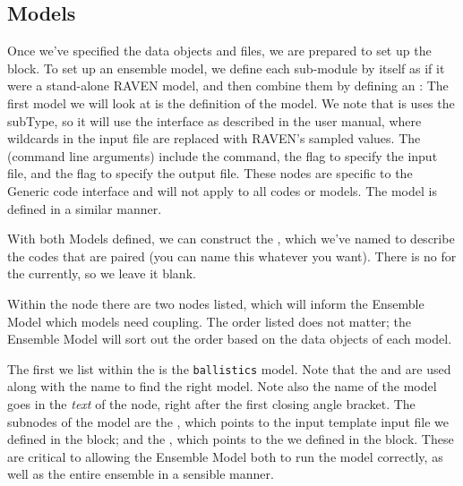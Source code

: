 \subsection{Models}
Once we've specified the data objects and files, we are prepared to set up the  block.  To set
up an ensemble model, we define each sub-module by itself as if it were a stand-alone RAVEN model, and then
combine them by defining an :
The first model we will look at is the definition of the  model.  We note that is uses
the  subType, so it will use the interface as described in the user manual, where
wildcards in the input file are replaced with RAVEN's sampled values.  The  (command line
arguments) include the  command, the  flag to specify the input file, and the
 flag to specify the output file.  These nodes are specific to the Generic code interface and
will not apply to all codes or models. The  model is defined in a similar manner.

With both Models defined, we can construct the , which we've named
 to describe the codes that are paired (you can name this whatever you
want).  There is no  for the  currently, so we leave it blank.

Within the  node there are two  nodes listed, which will inform the
Ensemble Model which models need coupling.  The order listed does not matter; the Ensemble Model will sort out
the order based on the  data objects of each model.

The first  we list within the  is the \texttt{ballistics} model.  Note
that the  and  are used along with the name to find the right model.  Note also
the name of the model goes in the \emph{text} of the  node, right after the first closing angle
bracket.  The subnodes of the  model are the , which points to the input
template input file we defined in the  block; and the , which points
to the  we defined in the  block.  These are critical to allowing the
Ensemble Model both to run the  model correctly, as well as the entire ensemble in a
sensible manner.


